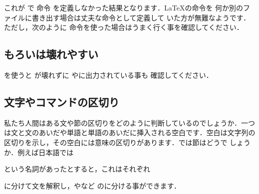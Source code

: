\begin{Prob}
これが で 命令
を定義しなかった結果となります．{\LaTeX}の命令を
何か別のファイルに書き出す場合は丈夫な命令として定義して
いた方が無難なようです．ただし，次のように 
命令を使った場合はうまく行く事を確認してください．

\begin{InTeX}
\section{もろい{\protect\moroiyen}は壊れやすい} 
\end{InTeX}

を使うと が壊れずに
やに出力されている事も
確認してください．
\end{Prob}

%


\subsection{文字やコマンドの区切り}

私たち人間はある文や節の区切りをどのように判断しているのでしょうか．一つ
は文と文のあいだや単語と単語のあいだに挿入される空白です．空白は文字列の
区切りを示し，その空白には意味の区切りがあります．では節はどうで
しょうか．例えば日本語では
\begin{quote} 
\end{quote}
という名詞があったとすると，これはそれぞれ
\begin{quote}  
\end{quote}
に分けて文を解釈し，{}や{}など
の{}に分ける事ができます．

